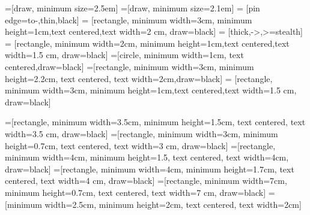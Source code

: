 \documentclass{article}
\begin{document}
\pagestyle{empty}

=[draw, minimum size=2.5em]
=[draw, minimum size=2.1em]
 = [pin edge={to-,thin,black}]
 = [rectangle, minimum width=3cm, minimum height=1cm,text centered,text width=2 cm, draw=black]
 = [thick,->,>=stealth]
= [rectangle, minimum width=2cm, minimum height=1cm,text centered,text width=1.5 cm, draw=black]
=[circle, minimum width=1cm, text centered,draw=black]
=[rectangle, minimum width=3cm, minimum height=2.2cm, text centered, text width=2cm,draw=black]
= [rectangle, minimum width=3cm, minimum height=1cm,text centered,text width=1.5 cm, draw=black]

=[rectangle, minimum width=3.5cm, minimum height=1.5cm, text centered, text width=3.5 cm, draw=black]
=[rectangle, minimum width=3cm, minimum height=0.7cm, text centered, text width=3 cm, draw=black]
=[rectangle, minimum width=4cm, minimum height=1.5, text centered, text width=4cm, draw=black]
=[rectangle, minimum width=4cm, minimum height=1.7cm, text centered, text width=4 cm, draw=black]
=[rectangle, minimum width=7cm, minimum height=0.7cm, text centered, text width=7 cm, draw=black]
=[minimum width=2.5cm, minimum height=2cm, text centered, text width=2cm]
\end{document}
